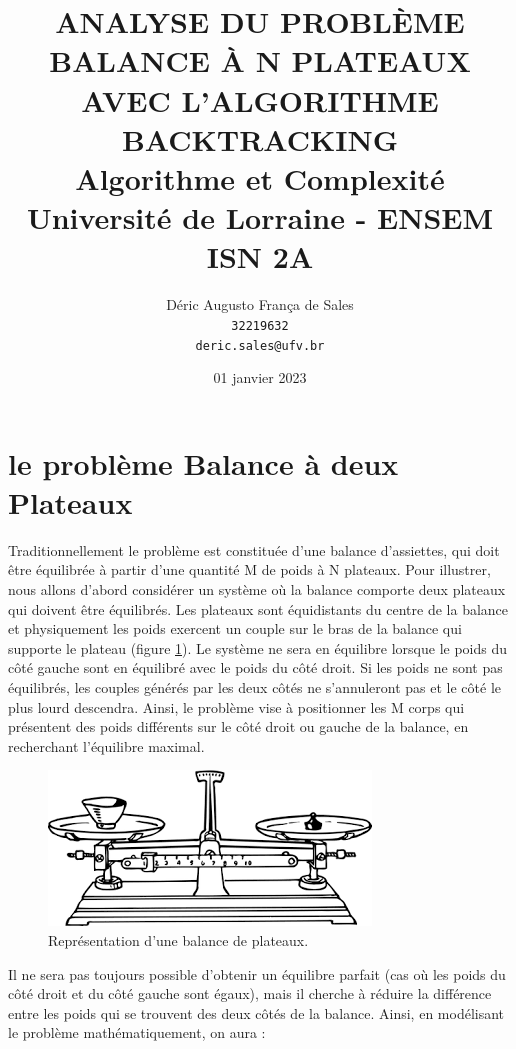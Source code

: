 \documentclass[12pt]{article} %
\title{
        \uppercase{Analyse du problème \\Balance à N Plateaux \\ avec l'algorithme backtracking} \\
    {\large Algorithme et Complexité} \\
    {\large Université de Lorraine - ENSEM ISN 2A}
}
\date{\vfill 01 janvier 2023}
\author{
  Déric Augusto França de Sales \\
  \texttt{32219632} \\
  \texttt{deric.sales@ufv.br}
  }
\begin{document}
\maketitle
\thispagestyle{empty}
\pagebreak


\setcounter{page}{1}
\FloatBarrier
\section{le problème Balance à deux Plateaux}


Traditionnellement le problème est constituée d'une balance d'assiettes, qui doit être équilibrée à partir d'une quantité M de poids à N plateaux. Pour illustrer, nous allons d'abord considérer un système où la balance comporte deux plateaux qui doivent être équilibrés. Les plateaux sont équidistants du centre de la balance et physiquement les poids exercent un couple sur le bras de la balance qui supporte le plateau (figure \ref{fig:scale}). Le système ne sera en équilibre lorsque le poids du côté gauche sont en équilibré avec le poids du côté droit. Si les poids ne sont pas équilibrés, les couples générés par les deux côtés ne s'annuleront pas et le côté le plus lourd descendra. Ainsi, le problème vise à positionner les M corps qui présentent des poids différents sur le côté droit ou gauche de la balance, en recherchant l'équilibre maximal. 

\FloatBarrier
\begin{figure}[!h]
\centering
\includegraphics[width = 0.5\linewidth]{imgs/scale2.png}
\caption{Représentation d'une balance de plateaux.}
\label{fig:scale}
\end{figure}
\FloatBarrier

Il ne sera pas toujours possible d'obtenir un équilibre parfait (cas où les poids du côté droit et du côté gauche sont égaux), mais il cherche à réduire la différence entre les poids qui se trouvent des deux côtés de la balance. Ainsi, en modélisant le problème mathématiquement, on aura :
\end{document}
